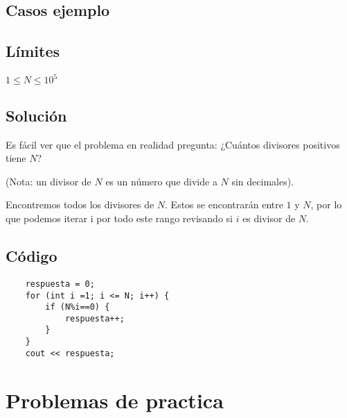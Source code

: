 \subsection*{Casos ejemplo}
\begin{casebox2}
\end{casebox2}
\subsection*{Límites}
\begin{plimits}
	\item \(1\leq N \leq 10^5\)
\end{plimits}

\subsection*{Solución}
Es fácil ver que el problema en realidad pregunta: ¿Cuántos divisores positivos tiene \(N\)?

(Nota: un divisor de \(N\) es un número que divide a \(N\) sin decimales).

Encontremos todos los divisores de \(N\). Estos se encontrarán entre \(1\) y \(N\), por lo que podemos iterar i por todo este rango revisando si \(i\) es divisor de \(N\).
\subsection*{Código}
\begin{lstlisting}
	respuesta = 0;
	for (int i =1; i <= N; i++) {
		if (N%i==0) {
			respuesta++;
		}
	}
	cout << respuesta;
\end{lstlisting}

\section*{Problemas de practica}

\begin{exercise}
\end{exercise}

\begin{exercise}
\end{exercise}

\begin{exercise}
\end{exercise}

\begin{exercise}
\end{exercise}

\begin{exercise}
\end{exercise}


